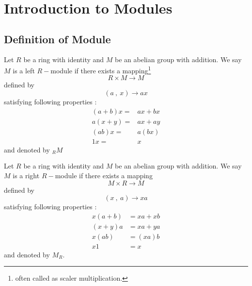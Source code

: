 \chapter{Introduction to Modules}
\section{\textbf{Definition of Module}}
\begin{defn}  

 Let $ R $ be a ring with identity and $ M $ be an abelian group with addition. We say $ M $ is a left $R-$module if there exists a mapping\footnote{often called as scaler multiplication.}
\begin{equation*}
R \times M \rightarrow M
\end{equation*}	
defined by
\begin{equation*}
(a \ , \ x) \rightarrow ax
\end{equation*}
satisfying following properties :
\begin{align}
(a+b) x =& ax + bx \\ a(x+y) =& ax + ay \\ (ab)x =& a(bx) \\ 1x =& x
\end{align}
and denoted by $_{R}M$
\end{defn}
\bigskip
\begin{defn}
 Let $ R $ be a ring with identity and $ M $ be an abelian group with addition. We say $ M $ is a right $R-$module if there exists a mapping
\begin{equation*}
M \times R \rightarrow M
\end{equation*}	
defined by
\begin{equation*}
(x \ ,\ a) \rightarrow xa
\end{equation*}
 satisfying following properties :
\begin{align}
x (a+b)  &= xa + xb \\ (x+y) a &= xa + ya \\ x (ab) &= (xa)b \\ x1 &= x
\end{align}
and denoted by $M_{R}$.         \end{defn}

